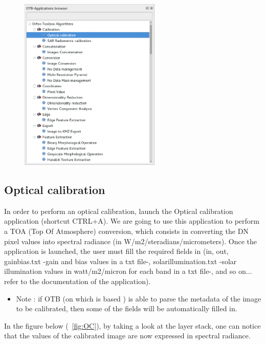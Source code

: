 \begin{figure}[!h] 
  \center
  \includegraphics[width=0.6\textwidth]{../Art/MonteverdiImages/applications.png}
  \label{fig:applications}
\end{figure}


\subsection{Optical calibration}\label{ssec:monoptical}

In order to perform an optical calibration, launch the Optical calibration application (shortcut CTRL+A). 
We are going to use this application to perform a TOA (Top Of Atmosphere) conversion, which consists in converting the DN pixel values into spectral radiance (in W/m2/steradians/micrometers).
Once the application is launched, the user must fill the required fields in
(in, out, gainbias.txt -gain and bias values in a txt file-, solarillumination.txt -solar illumination values in watt/m2/micron for each band in a txt file-, and so on... refer to the documentation of the application).
\begin{itemize}
\item Note : if OTB (on which is based \mont) is able to parse the metadata of the image to be calibrated, then some of the fields will be automatically filled in.
\end{itemize}

In the figure below (~\ref{fig:OC}), by taking a look at the layer stack, one can notice that the values of the calibrated image are now expressed in spectral radiance.


